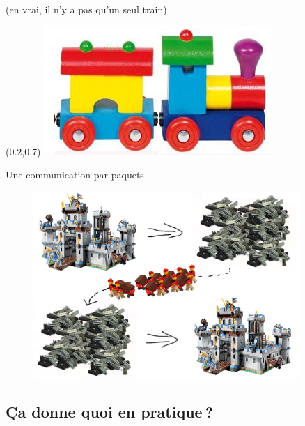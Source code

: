\begin{frame}{\hfill(en vrai, il n'y a pas qu'un seul train)}
\begin{textblock*}{12em}
  \end{textblock*}
  \begin{textblock*}{12em}(0.2\textwidth,0.7\textheight)
    \includegraphics[width=\textwidth]{concepts/paquet.png}
  \end{textblock*}
\end{frame}

\begin{frame}{Une communication par paquets}
  \begin{figure}
    \includegraphics[width=0.9\textwidth]{concepts/lego-paquets.png}
  \end{figure}
\end{frame}

\subsection{Ça donne quoi en pratique ?}

